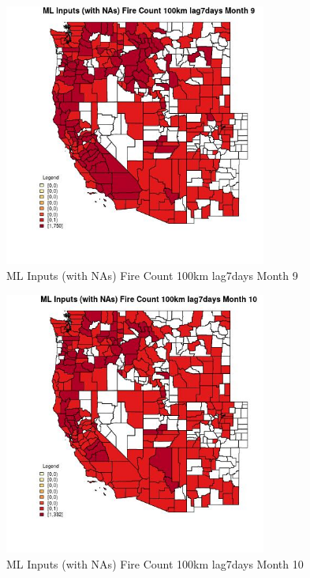 \begin{figure} 
\centering  
\includegraphics[width=0.77\textwidth]{Code_Outputs/Report_ML_input_PM25_Step4_part_e_de_duplicated_aves_compiled_2019-05-21wNAs_CountyFire_Count_100km_lag7daysmedianMonth9.jpg} 
\caption{\label{fig:Report_ML_input_PM25_Step4_part_e_de_duplicated_aves_compiled_2019-05-21wNAsCountyFire_Count_100km_lag7daysmedianMonth9}ML Inputs (with NAs) Fire Count 100km lag7days Month 9} 
\end{figure} 
 

\begin{figure} 
\centering  
\includegraphics[width=0.77\textwidth]{Code_Outputs/Report_ML_input_PM25_Step4_part_e_de_duplicated_aves_compiled_2019-05-21wNAs_CountyFire_Count_100km_lag7daysmedianMonth10.jpg} 
\caption{\label{fig:Report_ML_input_PM25_Step4_part_e_de_duplicated_aves_compiled_2019-05-21wNAsCountyFire_Count_100km_lag7daysmedianMonth10}ML Inputs (with NAs) Fire Count 100km lag7days Month 10} 
\end{figure} 
 

